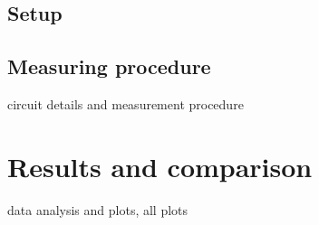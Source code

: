 



\subsection{Setup} 
\subsection{Measuring procedure} 

circuit details and measurement procedure


\section{Results and comparison} %
\label{sec:future_proyection}

data analysis and plots, all plots 



